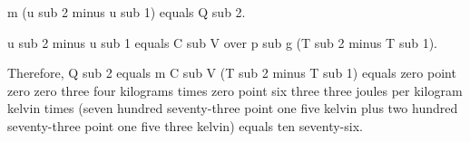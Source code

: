 m (u sub 2 minus u sub 1) equals Q sub 2.

u sub 2 minus u sub 1 equals C sub V over p sub g (T sub 2 minus T sub 1).

Therefore, Q sub 2 equals m C sub V (T sub 2 minus T sub 1) equals zero point zero zero three four kilograms times zero point six three three joules per kilogram kelvin times (seven hundred seventy-three point one five kelvin plus two hundred seventy-three point one five three kelvin) equals ten seventy-six.